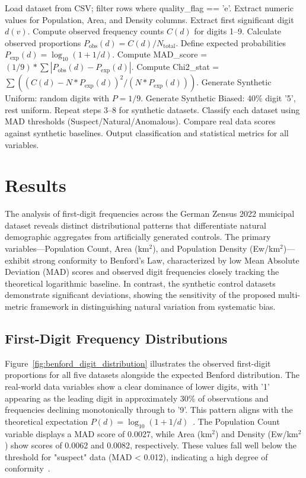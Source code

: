 \documentclass[11pt,a4paper]{article}
\begin{document}
\begin{algorithm}[t]
\caption{Benford Conformity Analysis Pipeline}
\label{alg:benford_pipeline}
\begin{algorithmic}[1]
\State Load dataset from CSV; filter rows where quality\_flag == 'e'.
\State Extract numeric values for Population, Area, and Density columns.
    \State Extract first significant digit $d(v)$.
\EndFor
\State Compute observed frequency counts $C(d)$ for digits 1--9.
\State Calculate observed proportions $P_{\text{obs}}(d) = C(d) / N_{\text{total}}$.
\State Define expected probabilities $P_{\text{exp}}(d) = \log_{10}(1 + 1/d)$.
\State Compute MAD\_score = $(1/9) * \sum |P_{\text{obs}}(d) - P_{\text{exp}}(d)|$.
\State Compute Chi2\_stat = $\sum ((C(d) - N*P_{\text{exp}}(d))^2 / (N*P_{\text{exp}}(d)))$.
\State Generate Synthetic Uniform: random digits with $P=1/9$.
\State Generate Synthetic Biased: 40\% digit '5', rest uniform.
\State Repeat steps 3--8 for synthetic datasets.
\State Classify each dataset using MAD thresholds (Suspect/Natural/Anomalous).
\State Compare real data scores against synthetic baselines.
\State Output classification and statistical metrics for all variables.
\end{algorithmic}
\end{algorithm}

\section{Results}
The analysis of first-digit frequencies across the German Zensus 2022 municipal dataset reveals distinct distributional patterns that differentiate natural demographic aggregates from artificially generated controls. The primary variables---Population Count, Area (km$^2$), and Population Density (Ew/km$^2$)---exhibit strong conformity to Benford's Law, characterized by low Mean Absolute Deviation (MAD) scores and observed digit frequencies closely tracking the theoretical logarithmic baseline. In contrast, the synthetic control datasets demonstrate significant deviations, showing the sensitivity of the proposed multi-metric framework in distinguishing natural variation from systematic bias.

\subsection{First-Digit Frequency Distributions}

Figure~\ref{fig:benford_digit_distribution} illustrates the observed first-digit proportions for all five datasets alongside the expected Benford distribution. The real-world data variables show a clear dominance of lower digits, with '1' appearing as the leading digit in approximately 30\% of observations and frequencies declining monotonically through to '9'. This pattern aligns with the theoretical expectation $P(d) = \log_{10}(1 + 1/d)$~\cite{Hill1998TheFD}. The Population Count variable displays a MAD score of 0.0027, while Area (km$^2$) and Density (Ew/km$^2$) show scores of 0.0062 and 0.0082, respectively. These values fall well below the threshold for "suspect" data (MAD < 0.012), indicating a high degree of conformity~\cite{Kossler2024SomeNI}.
\end{document}
